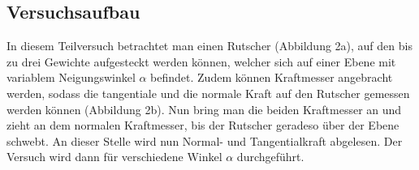 \documentclass{article}
\begin{document}
\subsection{Versuchsaufbau}
In diesem Teilversuch betrachtet man einen Rutscher (Abbildung 2a), auf den bis zu drei Gewichte
aufgesteckt werden können, welcher sich auf einer Ebene mit variablem Neigungswinkel $\alpha$ befindet. Zudem können Kraftmesser angebracht werden, sodass die tangentiale und die normale Kraft auf den Rutscher gemessen werden können (Abbildung 2b). Nun bring man die beiden Kraftmesser an und zieht an dem normalen Kraftmesser, bis der Rutscher geradeso über der Ebene schwebt. An dieser Stelle wird nun Normal- und Tangentialkraft abgelesen. Der Versuch wird dann für verschiedene Winkel $\alpha$ durchgeführt.
\begin{figure}
    \centering
    \qquad
    \caption{}
    \label{fig:example}%
\end{figure}
\end{document}
